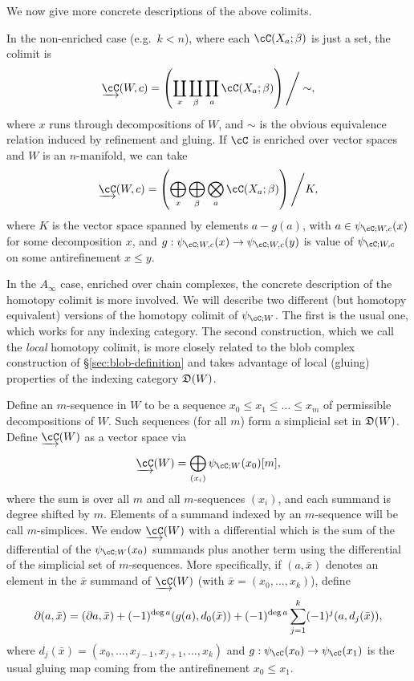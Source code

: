 \medskip

We now give more concrete descriptions of the above colimits.

In the non-enriched case (e.g.\ $k<n$), where each $\cC(X_a; \beta)$ is just a set,
the colimit is
\[
	\cl{\cC}(W,c) = \left( \coprod_x \coprod_\beta \prod_a \cC(X_a; \beta) \right) \Bigg/ \sim ,
\]
where $x$ runs through decompositions of $W$, and $\sim$ is the obvious equivalence relation 
induced by refinement and gluing.
If $\cC$ is enriched over vector spaces and $W$ is an $n$-manifold, 
we can take
\begin{equation*}
	\cl{\cC}(W,c) = \left( \bigoplus_x \bigoplus_\beta \bigotimes_a \cC(X_a; \beta) \right) \Bigg/ K,
\end{equation*}
where $K$ is the vector space spanned by elements $a - g(a)$, with
$a\in \psi_{\cC;W,c}(x)$ for some decomposition $x$, and $g: \psi_{\cC;W,c}(x)
\to \psi_{\cC;W,c}(y)$ is value of $\psi_{\cC;W,c}$ on some antirefinement $x \leq y$.

In the $A_\infty$ case, enriched over chain complexes, the concrete description of the homotopy colimit
is more involved.
We will describe two different (but homotopy equivalent) versions of the homotopy colimit of $\psi_{\cC;W}$.
The first is the usual one, which works for any indexing category.
The second construction, which we call the {\it local} homotopy colimit,
is more closely related to the blob complex
construction of \S \ref{sec:blob-definition} and takes advantage of local (gluing) properties
of the indexing category $\mathfrak{D}(W)$.

Define an $m$-sequence in $W$ to be a sequence $x_0 \le x_1 \le \dots \le x_m$ of permissible decompositions of $W$.
Such sequences (for all $m$) form a simplicial set in $\mathfrak{D}(W)$.
Define $\cl{\cC}(W)$ as a vector space via
\[
	\cl{\cC}(W) = \bigoplus_{(x_i)} \psi_{\cC;W}(x_0)[m] ,
\]
where the sum is over all $m$ and all $m$-sequences $(x_i)$, and each summand is degree shifted by $m$. 
Elements of a summand indexed by an $m$-sequence will be call $m$-simplices.
We endow $\cl{\cC}(W)$ with a differential which is the sum of the differential of the $\psi_{\cC;W}(x_0)$
summands plus another term using the differential of the simplicial set of $m$-sequences.
More specifically, if $(a, \bar{x})$ denotes an element in the $\bar{x}$
summand of $\cl{\cC}(W)$ (with $\bar{x} = (x_0,\dots,x_k)$), define
\[
	\partial (a, \bar{x}) = (\partial a, \bar{x}) + (-1)^{\deg{a}} (g(a), d_0(\bar{x})) + (-1)^{\deg{a}} \sum_{j=1}^k (-1)^{j} (a, d_j(\bar{x})) ,
\]
where $d_j(\bar{x}) = (x_0,\dots,x_{j-1},x_{j+1},\dots,x_k)$ and $g: \psi_\cC(x_0)\to \psi_\cC(x_1)$
is the usual gluing map coming from the antirefinement $x_0 \le x_1$.

